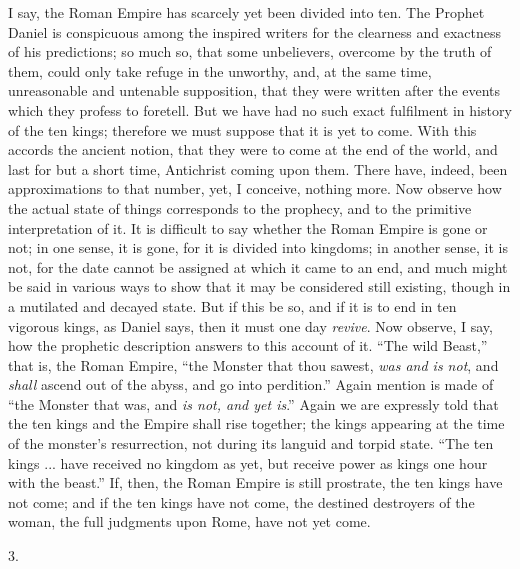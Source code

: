 I say, the Roman Empire has scarcely yet been divided into ten. The
Prophet Daniel is conspicuous among the inspired writers for the
clearness and exactness of his predictions; so much so, that some
unbelievers, overcome by the truth of them, could only take refuge in
the unworthy, and, at the same time, unreasonable and untenable
supposition, that they were written after the events which they
profess to foretell. But we have had no such exact fulfilment in
history of the ten kings; therefore we must suppose that it is yet to
come. With this accords the ancient notion, that they were to come at
the end of the world, and last for but a short time, Antichrist coming
upon them. There have, indeed, been approximations to that number,
yet, I conceive, nothing more. Now observe how the actual state of
things corresponds to the prophecy, and to the primitive
interpretation of it. It is difficult to say whether the Roman Empire
is gone or not; in one sense, it is gone, for it is divided into
kingdoms; in another sense, it is not, for the date cannot be assigned
at which it came to an end, and much might be said in various ways to
show that it may be considered still existing, though in a mutilated
and decayed state. But if this be so, and if it is to end in ten
vigorous kings, as Daniel says, then it must one day \emph{revive}.
Now observe, I say, how the prophetic description answers to this
account of it. ``The wild Beast,'' that is, the Roman Empire,
``the Monster that thou sawest, \emph{was and is not}, and \emph{shall}
ascend out of the abyss, and go into perdition.'' Again mention is
made of ``the Monster that was, and \emph{is not, and yet is}.''
Again we are expressly told that the ten kings and the Empire shall
rise together; the kings appearing at the time of the monster's
resurrection, not during its languid and torpid state. ``The ten
kings ... have received no kingdom as yet, but receive power as kings
one hour with the beast.'' If, then, the Roman Empire is still
prostrate, the ten kings have not come; and if the ten kings have not
come, the destined destroyers of the woman, the full judgments upon
Rome, have not yet come.

3.

